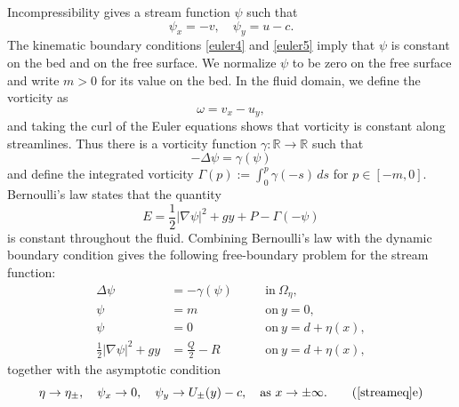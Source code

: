 \documentclass[12pt,letterpaper]{amsart}
\numberwithin{equation}{section}
\def\R{{\mathbb R}}
\begin{document}
	{Incompressibility gives a stream function} $\psi$ such that
	\begin{equation*}
		\psi_x=-v,\quad\psi_y=u-c.
	\end{equation*}
	{The kinematic boundary conditions \eqref{euler4} and \eqref{euler5} imply that $\psi$ is constant on the bed and on the free surface. We normalize $\psi$ to be zero on the free surface and write $m>0$ for its value on the bed.}
	In the fluid domain, we define the vorticity as
	\begin{equation*}
		\omega=v_x-u_y,
	\end{equation*}
	{and taking the curl of the Euler equations shows that vorticity is constant along streamlines. Thus there is a vorticity function $\gamma:\R\to\R$ such that~\cite{c-book}}
	\begin{equation*}
		-\Delta\psi=\gamma(\psi)
	\end{equation*}
	and define the integrated vorticity $\Gamma(p):=\int_0^p\gamma(-s)\,ds$ for $p\in[-m,0]$. Bernoulli's law states that the quantity
	\begin{equation*}
		E=\frac{1}{2}|\nabla\psi|^2+gy+P-\Gamma(-\psi)
	\end{equation*}
	is constant throughout the fluid. Combining Bernoulli's law with the dynamic boundary condition gives the following free-boundary problem for the stream function:
	\begin{subequations}\label{streameq}
		\begin{align}
			\Delta\psi&=-\gamma(\psi)\quad&&\mathrm{in~}\Omega_\eta,\label{streameq1}\\
			\psi&=m&&\mathrm{on~}y=0,\label{streameq2}\\
			\psi&=0&&\mathrm{on~}y=d+\eta(x),\label{streameq3}\\
			\frac{1}{2}|\nabla\psi|^2+gy&=\frac{Q}{2}-R&&\mathrm{on~}y=d+\eta(x)\label{streameq4},
		\end{align}
	\end{subequations}
together with the asymptotic condition
	\begin{equation}
		\eta\to\eta_{\pm},\quad\psi_x\to0,\quad\psi_y\to U_{\pm}(y)-c,\quad\mathrm{as~}x\to\pm\infty.\tag{\ref{streameq}{e}}\label{streameq5}
	\end{equation}
	
\end{document}
